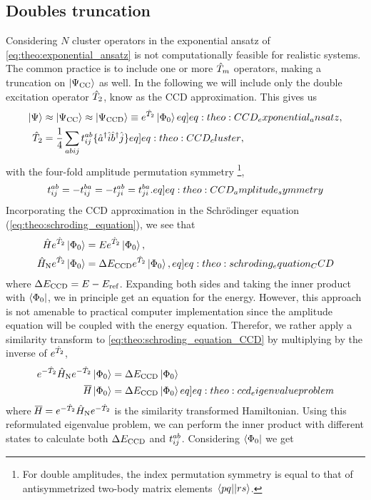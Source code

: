 \subsection{Doubles truncation}
Considering $N$ cluster operators in the exponential ansatz of \cref{eq:theo:exponential_ansatz} is not computationally feasible for realistic systems. The common practice is to include one or more $\hat{T}_{m}$ operators, making a truncation on $\ket{\Psi_{\text{CC}}}$ as well. In the following we will include only the double excitation operator $\hat{T}_{2}$, know as the CCD approximation. This gives us 
\begin{align}
    \ket{\Psi} &\approx \ketCC \approx \ketCCD \equiv \exp{\cluster{2}} \ketansatz \label[eq]{eq:theo:CCD_exponential_ansatz}, \\
    \cluster{2} &= \frac{1}{4}\sum_{abij} \amplitude{ab}{ij}\set{ \crt{a} \ani{i} \crt{b}\ani{j}} \label[eq]{eq:theo:CCD_cluster},
\end{align}
with the four-fold amplitude permutation symmetry \footnote{For double amplitudes, the index permutation symmetry is equal to that of antisymmetrized two-body matrix elements $\mel{pq}{}{rs}$.},
\begin{align}
    \amplitude{ab}{ij} = - \amplitude{ba}{ij} = - \amplitude{ab}{ji} = \amplitude{ba}{ji}. \label[eq]{eq:theo:CCD_amplitude_symmetry}
\end{align}
Incorporating the CCD approximation in the Schr\"odinger equation (\cref{eq:theo:schroding_equation}), we see that
\begin{align}
    \ham \exp{\cluster{2}} \ketansatz &= E \exp{\cluster{2}} \nonumber \ketansatz,  \\
    \hamno \exp{\cluster{2}} \ketansatz &= \DECCD \exp{\cluster{2}} \ketansatz, \label[eq]{eq:theo:schroding_equation_CCD}
\end{align}
where $\Delta E_{\text{CCD}} = E-E_{\text{ref}}$. Expanding both sides and taking the inner product with $\bra{\Phi_0}$, we in principle get an equation for the energy. However, this approach is not amenable to practical computer implementation \citep{bartlettCoupledClusterMethodsMolecular1984} since the amplitude equation will be coupled with the energy equation. Therefor, we rather apply a similarity transform to \cref{eq:theo:schroding_equation_CCD} by multiplying by the inverse of $e^{\hat{T}_{2}}$,
\begin{align}
    \exp{-\cluster{2}} \hamno \exp{-\cluster{2}} \ketansatz &= \DECCD \ketansatz \nonumber \\
    \simham \ketansatz &= \DECCD \ketansatz \label[eq]{eq:theo:ccd_eigenvalueproblem}
\end{align}
where $\overline{\mkern-1.9mu H\mkern-0.9mu} = e^{-\hat{T}_{2}} \hat{H}_\text{N} e^{-\hat{T}_{2}}$ is the similarity transformed Hamiltonian. Using this reformulated eigenvalue problem, we can perform the inner product with different states to calculate both $\Delta E_{\text{CCD}}$ and $t^{ab}_{ij}$. Considering $\bra{\Phi_0}$ we get

